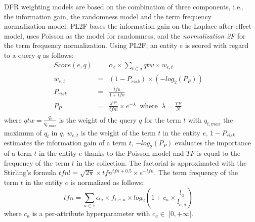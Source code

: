 DFR weighting models are based on the combination of three components, i.e., the information gain, the randomness model and the term frequency normalization model. PL2F bases the information gain on the Laplace after-effect model, uses Poisson as the model for randomness, and the \emph{normalization 2F} for the term frequency normalization.
Using PL2F, an entity $e$ is scored with regard to a query $q$ as follows:
\begin{eqnarray*}
  Score(e,q) & = & \alpha_e\times\sum_{t\in q}{qtw \times w_{e,t}}\\
  \label{eq:dfr-score}
  w_{e,t} & = & \left(1-P_{risk}\right) \times \left(-log_2\left(P_{P}\right)\right) \\
  \label{eq:dfr-term-weight}
  P_{risk} & = & \frac{tfn}{1+tfn} \\
  \label{eq:dfr-prisk}
  P_{P} & = & \frac{\lambda^{tfn}}{tfn!}\times e^{-\lambda} \:\text{ where }\: \lambda=\frac{TF}{N} \\
  \label{eq:dfr:rand-poisson}
\end{eqnarray*}  
where $qtw=\frac{q_t}{q_{t,max}}$ is the weight of the query $q$ for the term $t$ with $q_{t,max}$ the maximum of $q_t$ in $q$, $w_{e,t}$ is the weight of the term $t$ in the entity $e$, $1-P_{risk}$ estimates the information gain of a term $t$, $-log_2\left(P_{P}\right)$ evaluates the importance of a term $t$ in the entity $e$ thanks to the Poisson model and $TF$ is equal to the frequency of the term $t$ in the collection. The factorial is approximated with the Stirling's formula \mbox{$tfn!=\sqrt{2\pi}\times tfn^{tfn+0.5}\times e^{-tfn}$}.
The term frequency of the term $t$ in the entity $e$ is normalized as follows:
\begin{equation}
  tfn = \sum_{a\in e}{\alpha_a\times f_{t,e,a} \times log_2\left(1+c_a\times\frac{l_a}{l_{e,a}}\right)}
  \label{eq:pl2f}
\end{equation}
where $c_a$ is a per-attribute hyperparameter with $c_a \in\;]0,+\infty[$.
